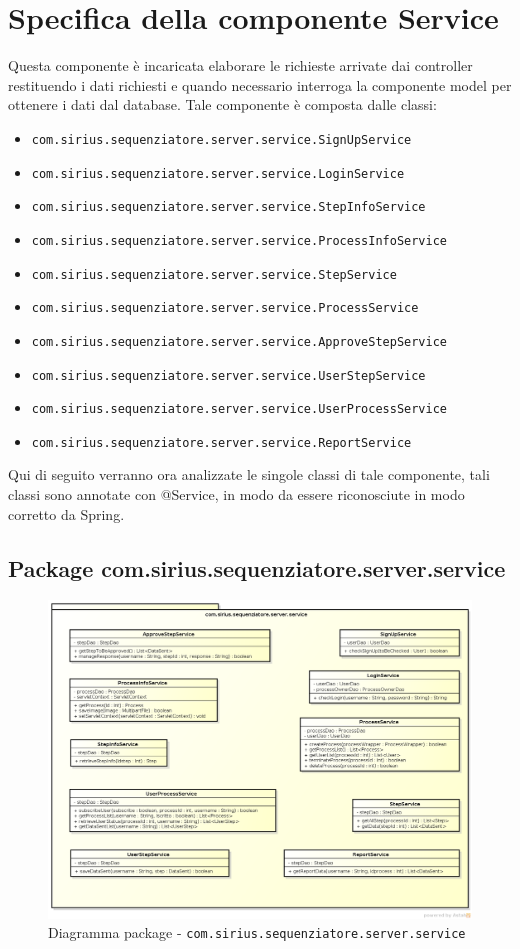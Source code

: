 \section{Specifica della componente Service}
Questa componente è incaricata elaborare le richieste arrivate dai controller restituendo i dati richiesti e quando necessario interroga la componente model per ottenere i dati dal database.
Tale componente è composta dalle classi:
\begin{itemize}
	\item \texttt{com.sirius.sequenziatore.server.service.SignUpService}
	\item \texttt{com.sirius.sequenziatore.server.service.LoginService}
	\item \texttt{com.sirius.sequenziatore.server.service.StepInfoService}
	\item \texttt{com.sirius.sequenziatore.server.service.ProcessInfoService}
	\item \texttt{com.sirius.sequenziatore.server.service.StepService}
	\item \texttt{com.sirius.sequenziatore.server.service.ProcessService}
	\item \texttt{com.sirius.sequenziatore.server.service.ApproveStepService}
	\item \texttt{com.sirius.sequenziatore.server.service.UserStepService}
	\item \texttt{com.sirius.sequenziatore.server.service.UserProcessService}
	\item \texttt{com.sirius.sequenziatore.server.service.ReportService}
\end{itemize}
Qui di seguito verranno ora analizzate le singole classi di tale componente, tali classi sono annotate con @Service, in modo da essere riconosciute in modo corretto da Spring.
\subsection{Package com.sirius.sequenziatore.server.service}
\begin{figure}[H] \centering \includegraphics[width=%
\textwidth]
{./classi/server/service.png} \caption{Diagramma package - \texttt{com.sirius.sequenziatore.server.service}}
\end{figure}
